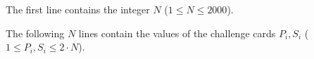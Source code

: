 
The first line contains the integer $N$ ($1 \leq N \leq 2000$).

The following $N$ lines contain the values of the challenge cards $P_i, S_i$ ($1 \leq P_i, S_i \leq 2 \cdot N$).

